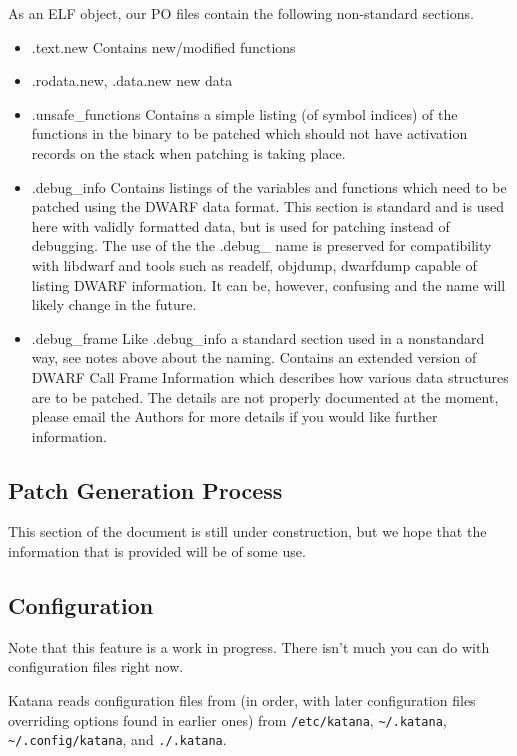 \documentclass[11pt]{article}
\begin{document}
   As an ELF object, our PO files contain the following non-standard
   sections.

\begin{itemize}
\item .text.new
     Contains new/modified functions
\item .rodata.new, .data.new
     new data
\item .unsafe\_{}functions
     Contains a simple listing (of symbol indices) of the functions in
     the binary to be patched which should not have activation records
     on the stack when patching is taking place.
\item .debug\_{}info
     Contains listings of the variables and functions which need to be
     patched using the DWARF data format. This section is standard and
     is used here with validly formatted data, but is used for
     patching instead of debugging. The use of the the .debug\_{} name is
     preserved for compatibility with libdwarf and tools such as
     readelf, objdump, dwarfdump capable of listing DWARF
     information. It can be, however, confusing and the name will
     likely change in the future.
\item .debug\_{}frame
     Like .debug\_{}info a standard section used in a nonstandard way,
     see notes above about the naming. Contains an extended version of
     DWARF Call Frame Information which describes how various data
     structures are to be patched. The details are not properly
     documented at the moment, please email the Authors for more
     details if you would like further information.
\end{itemize}
\subsection{Patch Generation Process}
\label{sec-3.7}

   This section of the document is still under construction, but we
   hope that the information that is provided will be of some use.


   
\subsection{Configuration}
\label{sec-3.8}

   Note that this feature is a work in progress. There isn't much you
   can do with configuration files right now.
   
   Katana reads configuration files from (in order, with later
   configuration files overriding options found in earlier ones) from
   \texttt{/etc/katana}, \texttt{\textasciitilde{}/.katana}, \texttt{\textasciitilde{}/.config/katana}, and \texttt{./.katana}.
\end{document}
